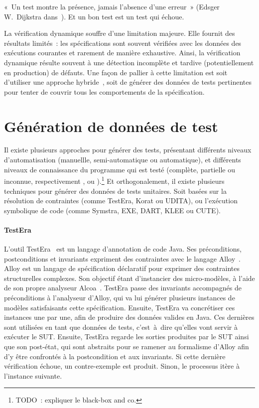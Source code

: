 «~Un test montre la présence, jamais l'absence d'une erreur~» (Edsger
W.~Dijkstra dans~). Et un bon test est un test qui échoue.


La vérification dynamique souffre d'une limitation majeure. Elle fournit des
résultats limités~: les spécifications sont souvent vérifiées avec les données
des exécutions courantes et rarement de manière exhaustive. Ainsi, la
vérification dynamique résulte souvent à une détection incomplète et tardive
(potentiellement en production) de défauts. Une façon de pallier à cette
limitation est soit d'utiliser une approche hybride~, soit de
générer des données de tests pertinentes pour tenter de couvrir tous les
comportements de la spécification.

\section{Génération de données de test}

Il existe plusieurs approches pour générer des tests, présentant différents
niveaux d'automatisation (manuellle, semi-automatique ou automatique), et
différents niveaux de connaissance du programme qui est testé (complète,
partielle ou inconnue, respectivement ,
 ou ).\footnote{TODO~: expliquer le
black-box and co.} Et orthogonalement, il existe plusieurs techniques pour
générer des données de tests unitaires. Soit basées sur la résolution de
contraintes (comme TestEra, Korat ou UDITA), ou l'exécution symbolique de code
(comme Symstra, EXE, DART, KLEE ou CUTE).

\paragraph{TestEra} L'outil TestEra~ est un langage
d'annotation de code Java. Ses préconditions, postconditions et invariants
expriment des contraintes avec le langage Alloy~. Alloy est un
langage de spécification déclaratif pour exprimer des contraintes structurelles
complexes. Son objectif étant d'instancier des micro-modèles, à l'aide de son
propre analyseur Alcoa~. TestEra passe des invariants
accompagnés de préconditions à l'analyseur d'Alloy, qui va lui générer plusieurs
instances de modèles satisfaisants cette spécification. Ensuite, TestEra va
concrétiser ces instances une par une, afin de produire des données valides en
Java. Ces dernières sont utilisées en tant que données de tests, c'est~à~dire
qu'elles vont servir à exécuter le SUT. Ensuite, TestEra regarde les sorties
produites par le SUT ainsi que son post-état, qui sont abstraits pour se ramener
au formalisme d'Alloy afin d'y être confrontés à la postcondition et aux
invariants. Si cette dernière vérification échoue, un contre-exemple est
produit. Sinon, le processus itère à l'instance suivante.

